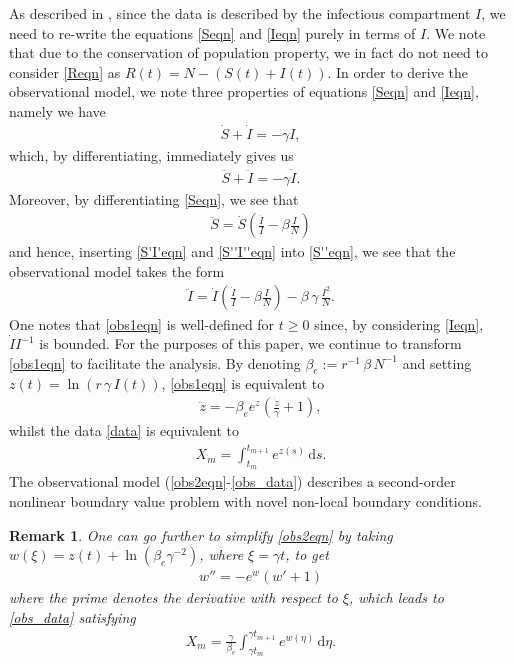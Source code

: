 \documentclass{article}
\newtheorem*{rem}{Remark}
\newcommand{\ds}{\text{d}s}
\newcommand{\obss}{(\ref{obs2eqn}-\ref{obs_data}) }
\newcommand{\be}{\beta_e}
\begin{document}
As described in \cite{CVAal21}, since the data is described by the infectious compartment $I$, we need to re-write the equations \eqref{Seqn} and \eqref{Ieqn} purely in terms of $I$. We note that due to the conservation of population property, we in fact do not need to consider \eqref{Reqn} as $R(t) = N - (S(t) + I(t))$. In order to derive the observational model, we note three properties of equations \eqref{Seqn} and \eqref{Ieqn}, namely we have
%
\begin{align}
    \dot{S} + \dot{I} = -\gamma I, \label{S'I'eqn}
\end{align}
%
which, by differentiating, immediately gives us
%
\begin{align}
    \ddot{S} + \ddot{I} = -\gamma \dot{I}. \label{S''I''eqn}
\end{align}
%
Moreover, by differentiating \eqref{Seqn}, we see that
%
\begin{align}
    \ddot{S} = \dot{S} \left( \frac{\dot{I}}{I} - \beta \frac{I}{N} \right) \label{S''eqn}
\end{align}
%
and hence, inserting \eqref{S'I'eqn} and \eqref{S''I''eqn} into \eqref{S''eqn}, we see that the observational model takes the form
%
\begin{align}
    \ddot{I} = \dot{I} \left( \frac{\dot{I}}{I} - \beta \frac{I}{N} \right) - \beta \, \gamma \, \frac{I^2}{N}. \label{obs1eqn}
\end{align}
%
One notes that \eqref{obs1eqn} is well-defined for $t \geq 0$ since, by considering \eqref{Ieqn}, $\dot{I} I^{-1}$ is bounded. For the purposes of this paper, we continue to transform \eqref{obs1eqn} to facilitate the analysis. By denoting $\be := r^{-1} \, \beta \, N^{-1}$ and setting $z(t) = \ln(r \, \gamma \, I(t))$, \eqref{obs1eqn} is equivalent to
%
\begin{align}
    \ddot{z} = -\be e^z \left( \frac{\dot{z}}{\gamma} + 1 \right), \label{obs2eqn}
\end{align}
%
whilst the data \eqref{data} is equivalent to 
%
\begin{align}
    X_m = \int_{t_m}^{t_{m+1}} e^{z(s)} \, \ds. \label{obs_data}
\end{align}
%
The observational model \obss describes a second-order nonlinear boundary value problem with novel non-local boundary conditions. 

\begin{rem}
One can go further to simplify \eqref{obs2eqn} by taking $w(\xi) = z(t) + \ln(\be \gamma^{-2})$, where $\xi = \gamma t$, to get
%
\begin{align*}
    w'' = -e^w \left(w' + 1 \right) %
\end{align*}
%
where the prime denotes the derivative with respect to $\xi$, which leads to \eqref{obs_data} satisfying
%
\begin{align*}
    X_m = \frac{\gamma}{\be} \int_{\gamma t_m}^{\gamma t_{m+1}} e^{w(\eta)} \, \text{d}\eta. %
\end{align*}
\end{rem} 
%
\end{document}
